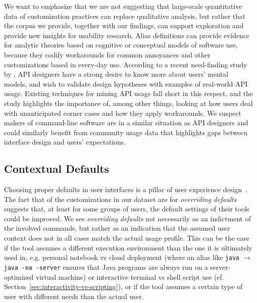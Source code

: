 \documentclass[sigconf,nonacm,screen]{acmart}
\newcommand{\per}[1]{\numprint[\%]{#1}}
\newcommand{\alias}[2]{{\texttt{#1} $\rightarrow$ \texttt{#2}}}
\begin{document}
We want to emphasize that we are not suggesting that large-scale quantitative data of customization practices can replace qualitative analysis, but rather that the corpus we provide, together with our findings, can support exploration and provide new insights for usability research.
Alias definitions can provide evidence for analytic theories based on cognitive or conceptual models of software use, because they codify workarounds for common annoyances and other customizations based in every-day use.
According to a recent need-finding study by \citet{zhang:20}, API designers have a strong desire to know more about users' mental models, and wish to validate design hypotheses with examples of real-world API usage.
Existing techniques for mining API usage fall short in this respect, and the study highlights the importance of, among other things, looking at how users deal with unanticipated corner cases and how they apply workarounds.
We suspect makers of command-line software are in a similar situation as API designers and could similarly benefit from community usage data that highlights gaps between interface design and users' expectations.

\subsection{Contextual Defaults}
\label{sec:contextual-defaults}

Choosing proper defaults in user interfaces is a pillar of user experience design~\citep{nielsen2005power}.
The fact that \per{14.48} of the customizations in our dataset are for \emph{overriding defaults} suggests that, at least for some groups of users, the default settings of their tools could be improved.
We see \emph{overriding defaults} not necessarily as an indictment of the involved commands, but rather as an indication that the assumed user context does not in all cases match the actual usage profile.
This can be the case if the tool assumes a different execution environment than the one it is ultimately used in, e.g. personal notebook vs cloud deployment (where an alias like \alias{java}{java -ea -server} ensures that Java programs are always run on a server-optimized virtual machine) or interactive terminal vs shell script use (cf. Section~\ref{sec:interactivity-vs-scripting}), or if the tool assumes a certain type of user with different needs than the actual user.
\end{document}
